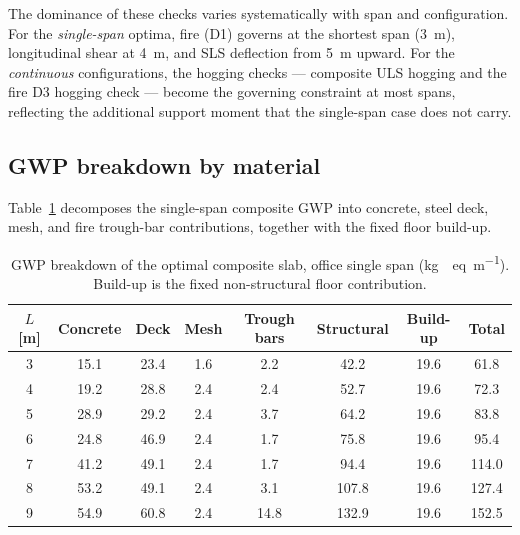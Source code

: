 
The dominance of these checks varies systematically with span and configuration. For the \emph{single-span} optima, fire (D1) governs at the shortest span (\SI{3}{\meter}), longitudinal shear at \SI{4}{\meter}, and SLS deflection from \SI{5}{\meter} upward. For the \emph{continuous} configurations, the hogging checks --- composite ULS hogging and the fire D3 hogging check --- become the governing constraint at most spans, reflecting the additional support moment that the single-span case does not carry.

\subsection{GWP breakdown by material}
\label{sec:res_breakdown_office}
Table~\ref{tab:office_breakdown} decomposes the single-span composite GWP into concrete, steel deck, mesh, and fire trough-bar contributions, together with the fixed floor build-up.

\begin{table}[h!]
\small\centering
\caption{GWP breakdown of the optimal composite slab, office single span (\si{\kilo\gram{}eq\per\meter}). Build-up is the fixed non-structural floor contribution.}
\label{tab:office_breakdown}
\begin{tabular}{cccccccc}
\toprule
$L$ [m] & Concrete & Deck & Mesh & Trough bars & Structural & Build-up & Total \\
\midrule
3 & 15.1 & 23.4 & 1.6 & 2.2 & 42.2 & 19.6 & 61.8 \\
4 & 19.2 & 28.8 & 2.4 & 2.4 & 52.7 & 19.6 & 72.3 \\
5 & 28.9 & 29.2 & 2.4 & 3.7 & 64.2 & 19.6 & 83.8 \\
6 & 24.8 & 46.9 & 2.4 & 1.7 & 75.8 & 19.6 & 95.4 \\
7 & 41.2 & 49.1 & 2.4 & 1.7 & 94.4 & 19.6 & 114.0 \\
8 & 53.2 & 49.1 & 2.4 & 3.1 & 107.8 & 19.6 & 127.4 \\
9 & 54.9 & 60.8 & 2.4 & 14.8 & 132.9 & 19.6 & 152.5 \\
\bottomrule
\end{tabular}
\end{table}

